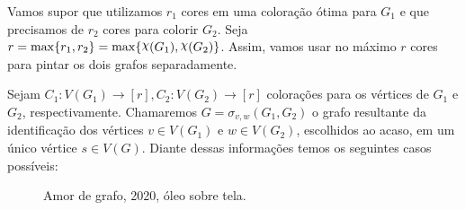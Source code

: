 \documentclass{homework}
\begin{document}
	\quest Vamos supor que utilizamos $r_1$ cores em uma coloração ótima para $G_1$ e que precisamos de $r_2$ cores para colorir $G_2$. Seja $r = \max \{r_1, r_2\} = \max\{\rchi(G_1), \rchi(G_2)\}$. Assim, vamos usar no máximo $r$ cores para pintar os dois grafos separadamente. \par
	
	Sejam $C_1 : V(G_1) \to [r], C_2 : V(G_2) \to [r]$ colorações para os vértices de $G_1$ e $G_2$, respectivamente. Chamaremos $G = \sigma_{v, w}(G_1, G_2)$ o grafo resultante da identificação dos vértices $v \in V(G_1)$ e $w \in V(G_2)$, escolhidos ao acaso, em um único vértice $s \in V(G)$. Diante dessas informações temos os seguintes casos possíveis: \par
	
	\begin{figure}[H]
		\centering
		
		\caption{Amor de grafo, 2020, óleo sobre tela.}
		\label{fig:2.1}
	\end{figure}
	
\end{document}
